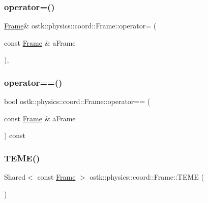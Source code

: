 \subsubsection{\texorpdfstring{operator=()}{operator=()}}
{\footnotesize\ttfamily \hyperlink{classostk_1_1physics_1_1coord_1_1_frame}{Frame}\& ostk\+::physics\+::coord\+::\+Frame\+::operator= (\begin{DoxyParamCaption}\item[{const \hyperlink{classostk_1_1physics_1_1coord_1_1_frame}{Frame} \&}]{a\+Frame }\end{DoxyParamCaption})\hspace{0.3cm}{\ttfamily [protected]}, {\ttfamily [default]}}

\mbox{\label{classostk_1_1physics_1_1coord_1_1_frame_a010fbd30fe3a937d44d0fbbdeb60222b}} 
\subsubsection{\texorpdfstring{operator==()}{operator==()}}
{\footnotesize\ttfamily bool ostk\+::physics\+::coord\+::\+Frame\+::operator== (\begin{DoxyParamCaption}\item[{const \hyperlink{classostk_1_1physics_1_1coord_1_1_frame}{Frame} \&}]{a\+Frame }\end{DoxyParamCaption}) const}

\mbox{\label{classostk_1_1physics_1_1coord_1_1_frame_a1441cef9cd2abe312753f3a81606adfb}} 
\subsubsection{\texorpdfstring{T\+E\+M\+E()}{TEME()}}
{\footnotesize\ttfamily Shared$<$ const \hyperlink{classostk_1_1physics_1_1coord_1_1_frame}{Frame} $>$ ostk\+::physics\+::coord\+::\+Frame\+::\+T\+E\+ME (\begin{DoxyParamCaption}{ }\end{DoxyParamCaption})\hspace{0.3cm}{\ttfamily [static]}}

